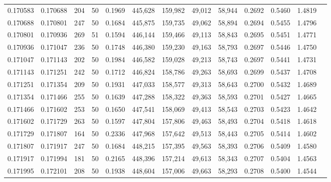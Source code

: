 \begin{tabular}{rrrrrrrrrrrrr}
0.170583 & 0.170688 &   204 &  50 &                                     0.1969 & 445,628 & 159,982 &  49,012 &  58,944 & 0.2692 & 0.5460 & 1.4819 \\
0.170688 & 0.170801 &   247 &  50 &                                     0.1684 & 445,875 & 159,735 &  49,062 &  58,894 & 0.2694 & 0.5455 & 1.4796 \\
0.170801 & 0.170936 &   269 &  51 &                                     0.1594 & 446,144 & 159,466 &  49,113 &  58,843 & 0.2695 & 0.5451 & 1.4771 \\
0.170936 & 0.171047 &   236 &  50 &                                     0.1748 & 446,380 & 159,230 &  49,163 &  58,793 & 0.2697 & 0.5446 & 1.4750 \\
0.171047 & 0.171143 &   202 &  50 &                                     0.1984 & 446,582 & 159,028 &  49,213 &  58,743 & 0.2697 & 0.5441 & 1.4731 \\
0.171143 & 0.171251 &   242 &  50 &                                     0.1712 & 446,824 & 158,786 &  49,263 &  58,693 & 0.2699 & 0.5437 & 1.4708 \\
0.171251 & 0.171354 &   209 &  50 &                                     0.1931 & 447,033 & 158,577 &  49,313 &  58,643 & 0.2700 & 0.5432 & 1.4689 \\
0.171354 & 0.171466 &   255 &  50 &                                     0.1639 & 447,288 & 158,322 &  49,363 &  58,593 & 0.2701 & 0.5427 & 1.4665 \\
0.171466 & 0.171602 &   253 &  50 &                                     0.1650 & 447,541 & 158,069 &  49,413 &  58,543 & 0.2703 & 0.5423 & 1.4642 \\
0.171602 & 0.171729 &   263 &  50 &                                     0.1597 & 447,804 & 157,806 &  49,463 &  58,493 & 0.2704 & 0.5418 & 1.4618 \\
0.171729 & 0.171807 &   164 &  50 &                                     0.2336 & 447,968 & 157,642 &  49,513 &  58,443 & 0.2705 & 0.5414 & 1.4602 \\
0.171807 & 0.171917 &   247 &  50 &                                     0.1684 & 448,215 & 157,395 &  49,563 &  58,393 & 0.2706 & 0.5409 & 1.4580 \\
0.171917 & 0.171994 &   181 &  50 &                                     0.2165 & 448,396 & 157,214 &  49,613 &  58,343 & 0.2707 & 0.5404 & 1.4563 \\
0.171995 & 0.172101 &   208 &  50 &                                     0.1938 & 448,604 & 157,006 &  49,663 &  58,293 & 0.2708 & 0.5400 & 1.4544 \\

\end{tabular}
